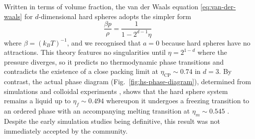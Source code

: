 \documentclass[11pt,twoside]{report}
\begin{document}
Written in terms of volume fraction, the van der Waals equation \eqref{eq:van-der-waals} for $d$-dimensional hard spheres adopts the simpler form%
\begin{equation}\label{eq:van-der-waals-hs}
  \frac{\beta p}{\rho} = \frac{1}{1 - 2^{d-1} \eta}
\end{equation}
where $\beta = (k_B T)^{-1}$, and we recognised that $a = 0$ because hard spheres have no attractions.
This theory features no singularities until $\eta = 2^{1-d}$ where the pressure diverges, so it predicts no thermodynamic phase transitions and contradicts the existence of a close packing limit at $\eta_\mathrm{CP} \sim 0.74$ in $d=3$.
By contrast, the actual phase diagram (Fig.\ \ref{fig:hs-phase-diagram}), determined from simulations \cite{AlderJCP1957,WoodJCP1957,HooverJCP1968} and colloidal experiments \cite{PuseyN1986}, shows that the hard sphere system remains a liquid%
up to $\eta_f \sim 0.494$ whereupon it undergoes a freezing transition to an ordered phase with an accompanying melting transition at $\eta_m \sim 0.545$ \cite{HooverJCP1968}.
Despite the early simulation studies being definitive, this result was not immediately accepted by the community.
\end{document}
